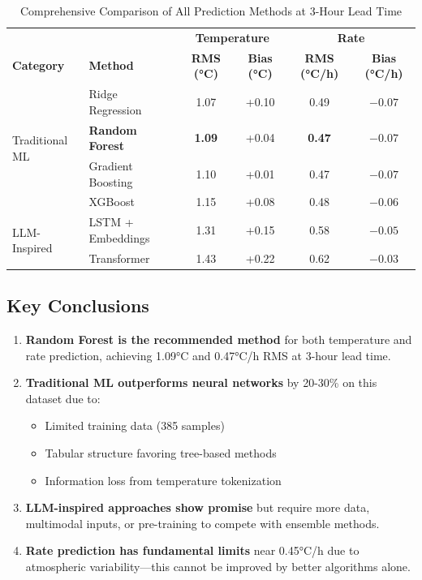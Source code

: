 \documentclass[11pt,letterpaper]{article}
\begin{document}
\begin{table}[H]
\centering
\caption{Comprehensive Comparison of All Prediction Methods at 3-Hour Lead Time}
\label{tab:comprehensive}
\begin{tabular}{l|l|cc|cc}
\toprule
& & \multicolumn{2}{c|}{\textbf{Temperature}} & \multicolumn{2}{c}{\textbf{Rate}} \\
\textbf{Category} & \textbf{Method} & \textbf{RMS (°C)} & \textbf{Bias (°C)} & \textbf{RMS (°C/h)} & \textbf{Bias (°C/h)} \\
\midrule
\multirow{4}{*}{Traditional ML}
& Ridge Regression & 1.07 & +0.10 & 0.49 & $-0.07$ \\
& \cellcolor{bestcolor}\textbf{Random Forest} & \cellcolor{bestcolor}\textbf{1.09} & \cellcolor{bestcolor}+0.04 & \cellcolor{bestcolor}\textbf{0.47} & \cellcolor{bestcolor}$-0.07$ \\
& Gradient Boosting & 1.10 & +0.01 & 0.47 & $-0.07$ \\
& XGBoost & 1.15 & +0.08 & 0.48 & $-0.06$ \\
\midrule
\multirow{2}{*}{LLM-Inspired}
& LSTM + Embeddings & 1.31 & +0.15 & 0.58 & $-0.05$ \\
& Transformer & 1.43 & +0.22 & 0.62 & $-0.03$ \\
\bottomrule
\end{tabular}
\end{table}

\subsection{Key Conclusions}

\begin{enumerate}
    \item \textbf{Random Forest is the recommended method} for both temperature and rate prediction, achieving 1.09°C and 0.47°C/h RMS at 3-hour lead time.

    \item \textbf{Traditional ML outperforms neural networks} by 20-30\% on this dataset due to:
    \begin{itemize}
        \item Limited training data (385 samples)
        \item Tabular structure favoring tree-based methods
        \item Information loss from temperature tokenization
    \end{itemize}

    \item \textbf{LLM-inspired approaches show promise} but require more data, multimodal inputs, or pre-training to compete with ensemble methods.

    \item \textbf{Rate prediction has fundamental limits} near 0.45°C/h due to atmospheric variability---this cannot be improved by better algorithms alone.
\end{enumerate}
\end{document}
